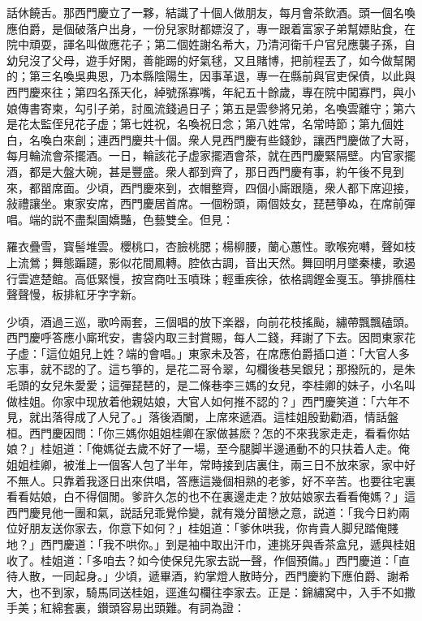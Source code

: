 話休饒舌。那西門慶立了一夥，結識了十個人做朋友，每月會茶飲酒。頭一個名喚應伯爵，是個破落户出身，一份兒家財都嫖沒了，專一跟着富家子弟幫嫖貼食，在院中頑耍，諢名叫做應花子；第二個姓謝名希大，乃清河衛千户官兒應襲子孫，自幼兒沒了父母，遊手好閑，善能踢的好氣毬，又且賭博，把前程丟了，如今做幫閑的；第三名喚吳典恩，乃本縣陰陽生，因事革退，專一在縣前與官吏保債，以此與西門慶來往；第四名孫天化，綽號孫寡嘴，年紀五十餘歲，專在院中闖寡門，與小娘傳書寄柬，勾引子弟，討風流錢過日子；第五是雲參將兄弟，名喚雲離守；第六是花太監侄兒花子虚；第七姓祝，名喚祝日念；第八姓常，名常時節；第九個姓白，名喚白來創；連西門慶共十個。衆人見西門慶有些錢鈔，讓西門慶做了大哥，每月輪流會茶擺酒。一日，輪該花子虚家擺酒會茶，就在西門慶緊隔壁。内官家擺酒，都是大盤大碗，甚是豐盛。衆人都到齊了，那日西門慶有事，約午後不見到來，都㽞席面。少頃，西門慶來到，衣帽整齊，四個小廝跟隨，衆人都下席迎接，敍禮讓坐。東家安席，西門慶居首席。一個粉頭，兩個妓女，琵琶箏ぬ，在席前彈唱。端的説不盡梨園嬌豔，色藝雙全。但見：
\begin{myquote}
羅衣疊雪，寳髻堆雲。櫻桃口，杏臉桃腮；楊柳腰，蘭心蕙性。歌喉宛囀，聲如枝上流鶯；舞態蹁躚，影似花間鳳轉。腔依古調，音出天然。舞回明月墜秦樓，歌遏行雲遮楚館。高低緊慢，按宫商吐玉噴珠；輕重疾徐，依格調鏗金戛玉。箏排鴈柱聲聲慢，板排紅牙字字新。
\end{myquote}

少頃，酒過三巡，歌吟兩套，三個唱的放下楽器，向前花枝搖颭，繡帶飄飄磕頭。西門慶呼答應小廝玳安，書袋内取三封賞賜，每人二錢，拜謝了下去。因問東家花子虚：「這位姐兒上姓？端的會唱。」東家未及答，在席應伯爵插口道：「大官人多忘事，就不認的了。這ち箏的，是花二哥令翠，勾欄後巷吴銀兒；那撥阮的，是朱毛頭的女兒朱愛愛；這彈琵琶的，是二條巷李三媽的女兒，李桂卿的妹子，小名叫做桂姐。你家中现放着他親姑娘，大官人如何推不認的？」西門慶笑道：「六年不見，就出落得成了人兒了。」落後酒闌，上席來遞酒。這桂姐殷勤勸酒，情話盤桓。西門慶因問：「你三媽你姐姐桂卿在家做甚麽？怎的不來我家走走，看看你姑娘？」桂姐道：「俺媽従去歲不好了一場，至今腿脚半邊通動不的只扶着人走。俺姐姐桂卿，被淮上一個客人包了半年，常時接到店裏住，兩三日不放來家，家中好不無人。只靠着我逐日出來供唱，答應這幾個相熟的老爹，好不辛苦。也要往宅裏看看姑娘，白不得個閒。爹許久怎的也不在裏邊走走？放姑娘家去看看俺媽？」這西門慶見他一團和氣，説話兒乖覺伶變，就有幾分㽞戀之意，説道：「我今日約兩位好朋友送你家去，你意下如何？」桂姐道：「爹休哄我，你肯貴人脚兒踏俺賤地？」西門慶道：「我不哄你。」到是袖中取出汗巾，連挑牙與香茶盒兒，遞與桂姐收了。桂姐道：「多咱去？如今使保兒先家去説一聲，作個預備。」西門慶道：「直待人散，一同起身。」少頃，遞畢酒，約掌燈人散時分，西門慶約下應伯爵、謝希大，也不到家，騎馬同送桂姐，逕進勾欄往李家去。正是：錦繡窝中，入手不如撒手美；紅綿套裏，鑚頭容易出頭難。有詞為證：


